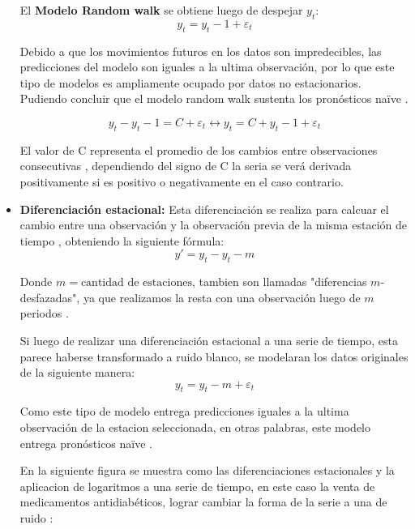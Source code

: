 \begin{itemize}
    El \textbf{Modelo Random walk} se obtiene luego de despejar $y_t$:
    \begin{equation*}
        y_t=y_t-1+\varepsilon_t
    \end{equation*}

    Debido a que los movimientos futuros en los datos son impredecibles, las predicciones del modelo son iguales a la ultima observación, por lo que este tipo de modelos es ampliamente ocupado por datos no estacionarios. Pudiendo concluir que el modelo random walk sustenta los pronósticos naïve \cite{forecast-time-series-arima}.

    \begin{equation*} y_t-y_t-1 = C+\varepsilon_t \leftrightarrow y_t=C+y_t-1+\varepsilon_t \end{equation*}

    El valor de C representa el promedio de los cambios entre observaciones consecutivas \cite{forecast-time-series-arima}, dependiendo del signo de C la seria se verá derivada positivamente si es positivo o negativamente en el caso contrario.

    \item \textbf{Diferenciación estacional:} Esta diferenciación se realiza para calcuar el cambio entre una observación y la observación previa de la misma estación de tiempo \cite{forecast-time-series-arima}, obteniendo la siguiente fórmula:
    \begin{equation*}
        y'=y_t-y_t-m
    \end{equation*}

    Donde $m= \text{cantidad de estaciones}$, tambien son llamadas "diferencias $m$-desfazadas", ya que realizamos la resta con una observación luego de $m$ periodos \cite{forecast-time-series-arima}.

    Si luego de realizar una diferenciación estacional a una serie de tiempo, esta parece haberse transformado a ruido blanco, se modelaran los datos originales de la siguiente manera:
    \begin{equation*}
        y_t=y_t-m+\varepsilon_t
    \end{equation*}

    Como este tipo de modelo entrega predicciones iguales a la ultima observación de la estacion seleccionada, en otras palabras, este modelo entrega pronósticos naïve \cite{forecast-time-series-arima}.

    En la siguiente figura se muestra como las diferenciaciones estacionales y la aplicacion de logaritmos a una serie de tiempo, en este caso la venta de medicamentos antidiabéticos, lograr cambiar la forma de la serie a una de ruido \cite{forecast-time-series-arima}:


\end{itemize}
